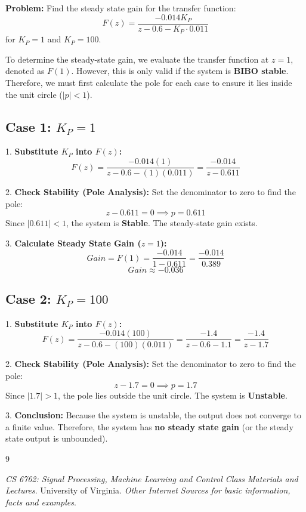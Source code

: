 \documentclass[a4paper,12pt]{article}
\begin{document}
\section{}

\textbf{Problem:} Find the steady state gain for the transfer function:
$$ F(z) = \frac{-0.014 K_P}{z - 0.6 - K_P \cdot 0.011} $$
for $K_P = 1$ and $K_P = 100$.

To determine the steady-state gain, we evaluate the transfer function at $z=1$, denoted as $F(1)$. However, this is only valid if the system is \textbf{BIBO stable}. Therefore, we must first calculate the pole for each case to ensure it lies inside the unit circle ($|p| < 1$).

\subsection{Case 1: $K_P = 1$}

1.  \textbf{Substitute $K_P$ into $F(z)$:}
    $$ F(z) = \frac{-0.014(1)}{z - 0.6 - (1)(0.011)} = \frac{-0.014}{z - 0.611} $$

2.  \textbf{Check Stability (Pole Analysis):}
    Set the denominator to zero to find the pole:
    $$ z - 0.611 = 0 \implies p = 0.611 $$
    Since $|0.611| < 1$, the system is \textbf{Stable}. The steady-state gain exists.

3.  \textbf{Calculate Steady State Gain ($z=1$):}
    $$ Gain = F(1) = \frac{-0.014}{1 - 0.611} = \frac{-0.014}{0.389} $$
    $$ Gain \approx -0.036 $$

\subsection{Case 2: $K_P = 100$}

1.  \textbf{Substitute $K_P$ into $F(z)$:}
    $$ F(z) = \frac{-0.014(100)}{z - 0.6 - (100)(0.011)} = \frac{-1.4}{z - 0.6 - 1.1} = \frac{-1.4}{z - 1.7} $$

2.  \textbf{Check Stability (Pole Analysis):}
    Set the denominator to zero to find the pole:
    $$ z - 1.7 = 0 \implies p = 1.7 $$
    Since $|1.7| > 1$, the pole lies outside the unit circle. The system is \textbf{Unstable}.

3.  \textbf{Conclusion:}
    Because the system is unstable, the output does not converge to a finite value. Therefore, the system has \textbf{no steady state gain} (or the steady state output is unbounded).

\begin{thebibliography}{9}

     \textit{CS 6762: Signal Processing, Machine Learning and Control Class Materials and Lectures}. University of Virginia.
     \textit{Other Internet Sources for basic information, facts and examples}.
    
\end{thebibliography}
\end{document}
